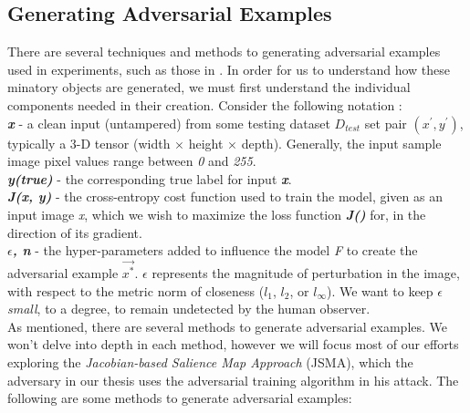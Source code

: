 \documentclass[grad,lot,lof,11pt,oneside,onehalfspace]{RUthesis}
\begin{document}
\subsection{Generating Adversarial Examples}
There are several techniques and methods to generating adversarial examples used in experiments, such as those in  \cite{kurakin_adversarial_2017}\cite{papernot_practical_2017}. In order for us to understand how these minatory objects are generated, we must first understand the individual components needed  in their creation. Consider the following notation \cite{kurakin_adversarial_2017}:\newline\\
\textbf{\textit{x}} - a clean input (untampered) from some testing dataset \textit{$D_{test}$} set pair \textit{$(x^{'},y^{'})$}, typically a 3-D tensor (width $\times$ height $\times$ depth). Generally, the input sample image pixel values range between \textit{0} and \textit{255}.\newline\\
\textbf{\textit{y(true)}} - the corresponding true label for input \textbf{\textit{x}}.\newline\\
\textbf{\textit{J(x, y)}} - the cross-entropy cost function used to train the model, given as an input image \textit{x}, which we wish to maximize the loss function \textit{\textbf{J()}} for, in the direction of its gradient.\newline\\
\textbf{\textit{$\epsilon$, \textit{n}}} - the hyper-parameters added to influence the model \textit{F} to create the adversarial example \textbf{$\vec{x^{*}}$}. $\epsilon$ represents the magnitude of perturbation in the image, with respect to the metric norm of closeness ($l_{1}$, $l_{2}$, or $l_{\infty}$). We want to keep $\epsilon$ \textit{small}, to a degree, to remain undetected by the human observer. 
\newline\\
As mentioned, there are several methods to generate adversarial examples. We won't delve into depth in each method, however we will focus most of our efforts exploring the \textit{Jacobian-based Salience Map Approach} (JSMA), which the adversary in our thesis uses the adversarial training algorithm in his attack.  The following are some methods to generate adversarial examples:
\end{document}
